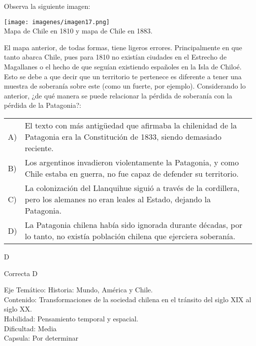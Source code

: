 \documentclass[letterpaper,11pt]{article}
\newcommand{\anchopregunta}{0.9\textwidth}
\begin{document}
\begin{enumerate}
\begin{minipage}{\anchopregunta}
\item Observa la siguiente imagen:
\begin{center}
    \texttt{[image: imagenes/imagen17.png]}\\
Mapa de Chile en 1810 y mapa de Chile en 1883.
\end{center}
El mapa anterior, de todas formas, tiene ligeros errores. Principalmente en que tanto abarca Chile, pues para 1810 no existían ciudades en el Estrecho de Magallanes o el hecho de que seguían existiendo españoles en la Isla de Chiloé. Esto se debe a que decir que un territorio te pertenece es diferente a tener una muestra de soberanía sobre este (como un fuerte, por ejemplo). Considerando lo anterior, ¿de qué manera se puede relacionar la pérdida de soberanía con la pérdida de la Patagonia?:
\begin{flushleft}\begin{tabular}{@{\hspace{-.001\textwidth}}l@{\hspace{2pt}}p{}}
A)&  El texto con más antigüedad que afirmaba la chilenidad de la Patagonia era la Constitución de 1833, siendo demasiado reciente.\\
B)& Los argentinos invadieron violentamente la Patagonia, y como Chile estaba en guerra, no fue capaz de defender su territorio.\\
C)& La colonización del Llanquihue siguió a través de la cordillera, pero los alemanes no eran leales al Estado, dejando la Patagonia.\\
D)& La Patagonia chilena había sido ignorada durante décadas, por lo tanto, no existía población chilena que ejerciera soberanía.\\
\end{tabular}\end{flushleft}%
\begin{key} D
\end{key} 
\begin{hint}
\end{hint}
\begin{answer} Correcta D\\
\end{answer}
\begin{info} %
\begin{flushleft}
Eje Temático: Historia: Mundo, América y Chile.\\
Contenido: Transformaciones de la sociedad chilena en el tránsito del siglo XIX al siglo XX. \\
Habilidad: Pensamiento temporal y espacial.\\
Dificultad: Media\\
Capsula: Por determinar \\
\end{flushleft}
\end{info}
\end{minipage}\vfill$\;$ %


\end{enumerate}
\end{document}
